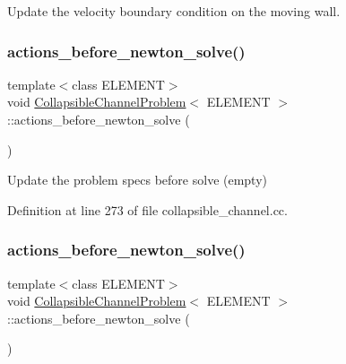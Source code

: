 Update the velocity boundary condition on the moving wall. 

\mbox{\label{classCollapsibleChannelProblem_ad7597f95eb755184ec1f9581c713ff78}} 
\subsubsection{\texorpdfstring{actions\+\_\+before\+\_\+newton\+\_\+solve()}{actions\_before\_newton\_solve()}\hspace{0.1cm}{\footnotesize\ttfamily [1/2]}}
{\footnotesize\ttfamily template$<$class E\+L\+E\+M\+E\+NT$>$ \\
void \hyperlink{classCollapsibleChannelProblem}{Collapsible\+Channel\+Problem}$<$ E\+L\+E\+M\+E\+NT $>$\+::actions\+\_\+before\+\_\+newton\+\_\+solve (\begin{DoxyParamCaption}{ }\end{DoxyParamCaption})\hspace{0.3cm}{\ttfamily [inline]}}



Update the problem specs before solve (empty) 



Definition at line 273 of file collapsible\+\_\+channel.\+cc.

\mbox{\label{classCollapsibleChannelProblem_ad7597f95eb755184ec1f9581c713ff78}} 
\subsubsection{\texorpdfstring{actions\+\_\+before\+\_\+newton\+\_\+solve()}{actions\_before\_newton\_solve()}\hspace{0.1cm}{\footnotesize\ttfamily [2/2]}}
{\footnotesize\ttfamily template$<$class E\+L\+E\+M\+E\+NT$>$ \\
void \hyperlink{classCollapsibleChannelProblem}{Collapsible\+Channel\+Problem}$<$ E\+L\+E\+M\+E\+NT $>$\+::actions\+\_\+before\+\_\+newton\+\_\+solve (\begin{DoxyParamCaption}{ }\end{DoxyParamCaption})\hspace{0.3cm}{\ttfamily [inline]}}



